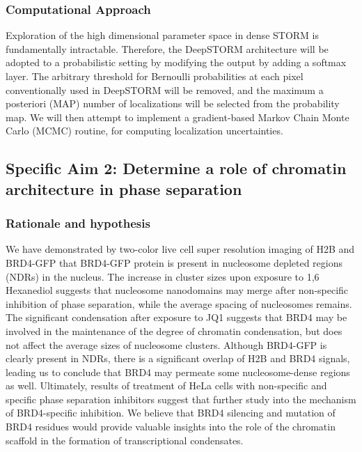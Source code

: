 \documentclass{ucetd}
\begin{document}
\subsubsection{Computational Approach}

Exploration of the high dimensional parameter space in dense STORM is fundamentally intractable. Therefore, the DeepSTORM architecture will be adopted to a probabilistic setting by modifying the output by adding a softmax layer. The arbitrary threshold for Bernoulli probabilities at each pixel conventionally used in DeepSTORM will be removed, and the maximum a posteriori (MAP) number of localizations will be selected from the probability map. We will then attempt to implement a gradient-based Markov Chain Monte Carlo (MCMC) routine, for computing localization uncertainties. 

\subsection{Specific Aim 2: Determine a role of chromatin architecture in phase separation}

\subsubsection{Rationale and hypothesis}

We have demonstrated by two-color live cell super resolution imaging of H2B and BRD4-GFP that BRD4-GFP protein is present in nucleosome depleted regions (NDRs) in the nucleus. The increase in cluster sizes upon exposure to 1,6 Hexanediol suggests that nucleosome nanodomains may merge after non-specific inhibition of phase separation, while the average spacing of nucleosomes remains. The significant condensation after exposure to JQ1 suggests that BRD4 may be involved in the maintenance of the degree of chromatin condensation, but does not affect the average sizes of nucleosome clusters. Although BRD4-GFP is clearly present in NDRs, there is a significant overlap of H2B and BRD4 signals, leading us to conclude that BRD4 may permeate some nucleosome-dense regions as well. Ultimately, results of treatment of HeLa cells with non-specific and specific phase separation inhibitors suggest that further study into the mechanism of BRD4-specific inhibition. We believe that BRD4 silencing and mutation of BRD4 residues would provide valuable insights into the role of the chromatin scaffold in the formation of transcriptional condensates.
\end{document}
